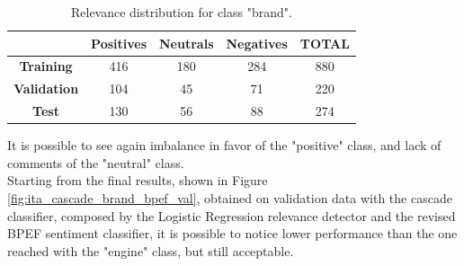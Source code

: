 \begin{table}[H]
	\centering
	\begin{tabular}{ | c | c  c c | c | } 
		\hline
		& \textbf{Positives} & \textbf{Neutrals} & \textbf{Negatives} & \textbf{TOTAL} \\
		\hline
		\textbf{Training} & 416 & 180 & 284 & 880 \\ 
		\hline
		\textbf{Validation} & 104 & 45 & 71 & 220 \\ 
		\hline
		\textbf{Test} & 130 & 56 & 88 & 274 \\
		\hline
	\end{tabular}
	\caption{Relevance distribution for class "brand".}
	\label{table:snt-dist-brand}
\end{table}

It is possible to see again imbalance in favor of the "positive" class, and lack of comments of the "neutral" class.\\
Starting from the final results, shown in Figure \ref{fig:ita_cascade_brand_bpef_val}, obtained on validation data with the cascade classifier, composed by the Logistic Regression relevance detector and the revised BPEF sentiment classifier, it is possible to notice lower performance than the one reached with the "engine" class, but still acceptable.


